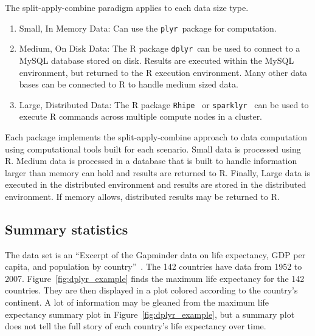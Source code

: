 \documentclass[stat,dissertation]{puthesis}\usepackage[]{graphicx}\usepackage{xcolor}
\newcommand{\pkg}[1]{\texttt{#1}}
\begin{document}
The split-apply-combine paradigm applies to each data size type.

\begin{enumerate}
  \item Small, In Memory Data: Can use the \pkg{plyr}~package for computation.
  \item Medium, On Disk Data: The R package \pkg{dplyr}~can be used to connect to a MySQL database stored on disk.  Results are executed within the MySQL environment, but returned to the R execution environment.  Many other data bases can be connected to R to handle medium sized data.
  \item Large, Distributed Data: The R package \pkg{Rhipe}~\cite{r_rhipe} or \pkg{sparklyr}~\cite{r_sparklyr} can be used to execute R commands across multiple compute nodes in a cluster.
\end{enumerate}

Each package implements the split-apply-combine approach to data computation using computational tools built for each scenario.  Small data is processed using R.  Medium data is processed in a database that is built to handle information larger than memory can hold and results are returned to R.  Finally, Large data is executed in the distributed environment and results are stored in the distributed environment.  If memory allows, distributed results may be returned to R.

\subsection{Summary statistics}

The  data set is an ``Excerpt of the Gapminder data on life expectancy, GDP per capita, and population by country''~\cite{r_gapminder}.  The 142 countries have data from 1952 to 2007.  Figure~\ref{fig:dplyr_example} finds the maximum life expectancy for the 142 countries. They are then displayed in a plot colored according to the country's continent.  A lot of information may be gleaned from the maximum life expectancy summary plot in Figure~\ref{fig:dplyr_example}, but a summary plot does not tell the full story of each country's life expectancy over time.
\end{document}
